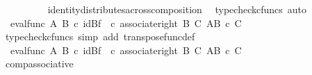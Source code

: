 \begin{isabellebody}
\ \ \ \ \ \ \ \ \isamarkupfalse%
\ identity{\isacharunderscore}{\kern0pt}distributes{\isacharunderscore}{\kern0pt}across{\isacharunderscore}{\kern0pt}composition\ \isamarkupfalse%
\ {\isacharparenleft}{\kern0pt}typecheck{\isacharunderscore}{\kern0pt}cfuncs{\isacharcomma}{\kern0pt}\ auto{\isacharparenright}{\kern0pt}\isanewline
\ \ \ \ \ \ \isamarkupfalse%
\ \isamarkupfalse%
\ {\isachardoublequoteopen}{\isachardot}{\kern0pt}{\isachardot}{\kern0pt}{\isachardot}{\kern0pt}\ {\isacharequal}{\kern0pt}{\isacharparenleft}{\kern0pt}eval{\isacharunderscore}{\kern0pt}func\ A\ B{\isacharparenright}{\kern0pt}\ {\isasymcirc}\isactrlsub c\ {\isacharparenleft}{\kern0pt}id{\isacharparenleft}{\kern0pt}B{\isacharparenright}{\kern0pt}{\isasymtimes}\isactrlsub f\ {\isasymphi}\isactrlsup {\isasymsharp}{\isacharparenright}{\kern0pt}\ {\isasymcirc}\isactrlsub c\ {\isacharparenleft}{\kern0pt}associate{\isacharunderscore}{\kern0pt}right\ B\ C\ {\isacharparenleft}{\kern0pt}A\isactrlbsup {\isacharparenleft}{\kern0pt}B\ {\isasymtimes}\isactrlsub c\ C{\isacharparenright}{\kern0pt}\isactrlesup {\isacharparenright}{\kern0pt}{\isacharparenright}{\kern0pt}{\isachardoublequoteclose}\isanewline
\ \ \ \ \ \ \ \ \isamarkupfalse%
\ {\isacharparenleft}{\kern0pt}typecheck{\isacharunderscore}{\kern0pt}cfuncs{\isacharcomma}{\kern0pt}\ simp\ add{\isacharcolon}{\kern0pt}\ transpose{\isacharunderscore}{\kern0pt}func{\isacharunderscore}{\kern0pt}def{\isacharparenright}{\kern0pt}\isanewline
\ \ \ \ \ \ \isamarkupfalse%
\ \isamarkupfalse%
\ {\isachardoublequoteopen}{\isachardot}{\kern0pt}{\isachardot}{\kern0pt}{\isachardot}{\kern0pt}\ {\isacharequal}{\kern0pt}{\isacharparenleft}{\kern0pt}{\isacharparenleft}{\kern0pt}eval{\isacharunderscore}{\kern0pt}func\ A\ B{\isacharparenright}{\kern0pt}\ {\isasymcirc}\isactrlsub c\ {\isacharparenleft}{\kern0pt}id{\isacharparenleft}{\kern0pt}B{\isacharparenright}{\kern0pt}{\isasymtimes}\isactrlsub f\ {\isasymphi}\isactrlsup {\isasymsharp}{\isacharparenright}{\kern0pt}{\isacharparenright}{\kern0pt}\ {\isasymcirc}\isactrlsub c\ {\isacharparenleft}{\kern0pt}associate{\isacharunderscore}{\kern0pt}right\ B\ C\ {\isacharparenleft}{\kern0pt}A\isactrlbsup {\isacharparenleft}{\kern0pt}B\ {\isasymtimes}\isactrlsub c\ C{\isacharparenright}{\kern0pt}\isactrlesup {\isacharparenright}{\kern0pt}{\isacharparenright}{\kern0pt}{\isachardoublequoteclose}\isanewline
\ \ \ \ \ \ \ \ \isamarkupfalse%
\ comp{\isacharunderscore}{\kern0pt}associative{}\ \isamarkupfalse%

\end{isabellebody}
